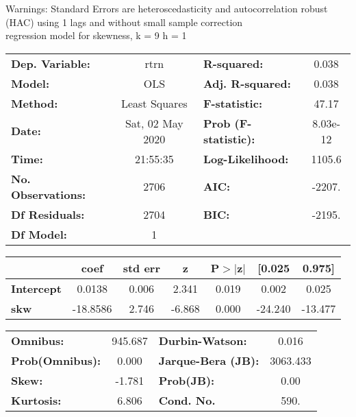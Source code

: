Warnings: \newline
 [1] Standard Errors are heteroscedasticity and autocorrelation robust (HAC) using 1 lags and without small sample correction\\ 

regression model for skewness, k = 9 h = 1\begin{center}
\begin{tabular}{lclc}
\toprule
\textbf{Dep. Variable:}    &       rtrn       & \textbf{  R-squared:         } &     0.038   \\
\textbf{Model:}            &       OLS        & \textbf{  Adj. R-squared:    } &     0.038   \\
\textbf{Method:}           &  Least Squares   & \textbf{  F-statistic:       } &     47.17   \\
\textbf{Date:}             & Sat, 02 May 2020 & \textbf{  Prob (F-statistic):} &  8.03e-12   \\
\textbf{Time:}             &     21:55:35     & \textbf{  Log-Likelihood:    } &    1105.6   \\
\textbf{No. Observations:} &        2706      & \textbf{  AIC:               } &    -2207.   \\
\textbf{Df Residuals:}     &        2704      & \textbf{  BIC:               } &    -2195.   \\
\textbf{Df Model:}         &           1      & \textbf{                     } &             \\
\bottomrule
\end{tabular}
\begin{tabular}{lcccccc}
                   & \textbf{coef} & \textbf{std err} & \textbf{z} & \textbf{P$> |$z$|$} & \textbf{[0.025} & \textbf{0.975]}  \\
\midrule
\textbf{Intercept} &       0.0138  &        0.006     &     2.341  &         0.019        &        0.002    &        0.025     \\
\textbf{skw}       &     -18.8586  &        2.746     &    -6.868  &         0.000        &      -24.240    &      -13.477     \\
\bottomrule
\end{tabular}
\begin{tabular}{lclc}
\textbf{Omnibus:}       & 945.687 & \textbf{  Durbin-Watson:     } &    0.016  \\
\textbf{Prob(Omnibus):} &   0.000 & \textbf{  Jarque-Bera (JB):  } & 3063.433  \\
\textbf{Skew:}          &  -1.781 & \textbf{  Prob(JB):          } &     0.00  \\
\textbf{Kurtosis:}      &   6.806 & \textbf{  Cond. No.          } &     590.  \\
\bottomrule
\end{tabular}
\end{center}

